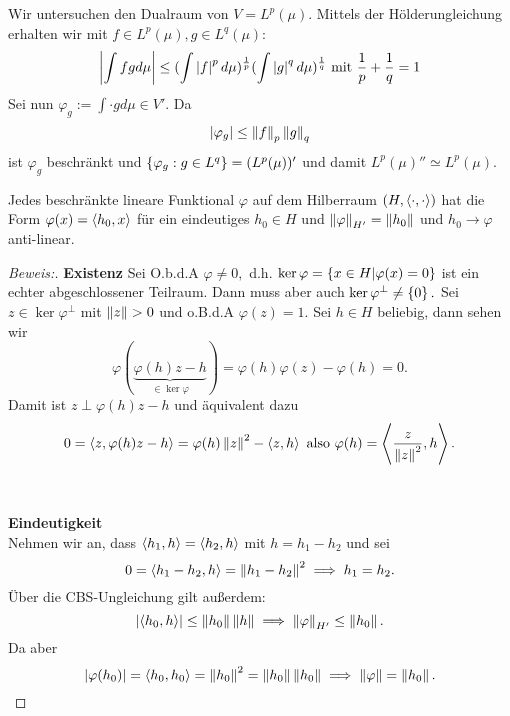 \begin{ex}
    Wir untersuchen den Dualraum von $V = L^p(\mu).$ Mittels der Hölderungleichung erhalten wir mit $f \in L^p(\mu), g \in L^q(\mu)$: \[\left\lvert \int fg d \mu \right\rvert \leq (\int\left\lvert f \right\rvert^p d \mu)^{\frac{1}{p}}(\int\left\lvert g \right\rvert^q d \mu)^{\frac{1}{q}} \text{ mit } \frac{1}{p} + \frac{1}{q} = 1\] Sei nun $\varphi_g := \int \cdot g d \mu \in V'.$ Da \[\left\lvert \varphi_g \right\rvert \leq \left\lVert f\right\rVert_p \left\lVert g\right\rVert_q\] ist $\varphi_g$ beschränkt und $\left\{\varphi_g: g \in L^q\right\} = (L^p(\mu))'$ und damit $L^p(\mu)'' \simeq L^p(\mu).$
\end{ex}


\begin{theorem}\label{riez1} Jedes beschränkte   lineare Funktional $\varphi$ auf dem Hilberraum $(H, \left\langle\cdot, \cdot\right\rangle)$ hat die Form $\varphi(x)= \left\langle h_0,x\right\rangle$ für ein eindeutiges $h_0 \in H$ und $\left\lVert\varphi\right\rVert_{H'} = \left\lVert h_0\right\rVert$ und $h_0 \to \varphi$ anti-linear.

\begin{proof}[Beweis:]
\textbf{Existenz}
Sei O.b.d.A $\varphi \not= 0,$ d.h. $\ker \varphi = \left\{x \in H | \varphi(x) = 0\right\}$ ist ein echter abgeschlossener Teilraum. Dann muss aber auch $\ker{\varphi^{\perp}} \not= \left\{0\right\}.$ Sei $z \in \ker{\varphi}^\perp$ mit $\left\lVert z\right\rVert>0$ und o.B.d.A $\varphi(z) = 1.$ Sei $h \in H$ beliebig, dann sehen wir \[ \varphi(\underbrace{\varphi(h)z-h}_{\in \ker\varphi }) = \varphi(h)\varphi(z)-\varphi(h) = 0.\] Damit ist $z \perp \varphi(h)z - h$ und äquivalent dazu \[0 = \left\langle z, \varphi(h)z-h\right\rangle = \varphi(h)\left\lVert z\right\rVert^2-\left\langle z,h\right\rangle \text{ also } \varphi(h) = \left\langle\frac{z}{\left\lVert z\right\rVert^2}, h\right\rangle.\] \\ \\\textbf{Eindeutigkeit} \\
Nehmen wir an, dass $\left\langle h_1, h\right\rangle = \left\langle h_2, h\right\rangle$ mit $h = h_1 - h_2$ und sei \[0 = \left\langle h_1 - h_2, h\right\rangle = \left\lVert h_1 - h_2\right\rVert^2 \implies h_1 = h_2.\] Über die CBS-Ungleichung gilt außerdem: \[\left\lvert \left\langle h_0, h\right\rangle \right\rvert \leq \left\lVert h_0\right\rVert\left\lVert h\right\rVert \implies \left\lVert\varphi\right\rVert_{H'} \leq \left\lVert h_0\right\rVert.\] Da aber \[\left\lvert \varphi(h_0) \right\rvert = \left\langle h_0, h_0\right\rangle = \left\lVert h_0\right\rVert^2 = \left\lVert h_0\right\rVert\left\lVert h_0\right\rVert \implies \left\lVert\varphi\right\rVert = \left\lVert h_0\right\rVert.\]
\end{proof}
\end{theorem}

